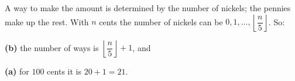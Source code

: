 A way to make the amount is determined by the number of nickels; the pennies make up the rest. With $n$ cents the number of nickels can be $0,1,\dots,\left\lfloor\dfrac {n}{5}\right\rfloor$. So:

\textbf{(b)} the number of ways is $\boxed{\left\lfloor\dfrac {n}{5}\right\rfloor+1}$, and

\textbf{(a)} for $100$ cents it is $20+1=\boxed{21}$.

